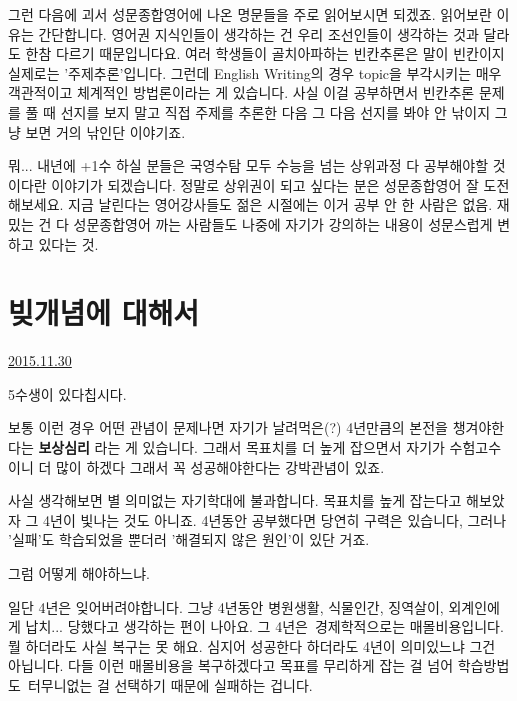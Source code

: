 그런 다음에 괴서 성문종합영어에 나온 명문들을 주로 읽어보시면 되겠죠.
읽어보란 이유는 간단합니다. 영어권 지식인들이 생각하는 건 우리 조선인들이 생각하는 것과 달라도 한참 다르기 때문입니다요.
여러 학생들이 골치아파하는 빈칸추론은 말이 빈칸이지 실제로는 '주제추론'입니다.
그런데 English Writing의 경우 topic을 부각시키는 매우 객관적이고 체계적인 방법론이라는 게 있습니다.
사실 이걸 공부하면서 빈칸추론 문제를 풀 때 선지를 보지 말고 직접 주제를 추론한 다음 그 다음 선지를 봐야 안 낚이지
그냥 보면 거의 낚인단 이야기죠.
\vspace{5mm}

뭐... 내년에 +1수 하실 분들은 국영수탐 모두 수능을 넘는 상위과정 다 공부해야할 것이다란 이야기가 되겠습니다.
정말로 상위권이 되고 싶다는 분은 성문종합영어 잘 도전해보세요. 지금 날린다는 영어강사들도 젊은 시절에는 이거 공부 안 한 사람은 없음.
재밌는 건 다 성문종합영어 까는 사람들도 나중에 자기가 강의하는 내용이 성문스럽게 변하고 있다는 것.
\vspace{5mm}










\section{빚개념에 대해서}
\href{https://www.kockoc.com/Apoc/518747}{2015.11.30}

\vspace{5mm}

5수생이 있다칩시다.
\vspace{5mm}

보통 이런 경우 어떤 관념이 문제나면
자기가 날려먹은(?) 4년만큼의 본전을 챙겨야한다는 \textbf{보상심리} 라는 게 있습니다.
그래서 목표치를 더 높게 잡으면서 자기가 수험고수이니 더 많이 하겠다 그래서 꼭 성공해야한다는 강박관념이 있죠.
\vspace{5mm}

사실 생각해보면 별 의미없는 자기학대에 불과합니다.
목표치를 높게 잡는다고 해보았자 그 4년이 빛나는 것도 아니죠.
4년동안 공부했다면 당연히 구력은 있습니다, 그러나 '실패'도 학습되었을 뿐더러 '해결되지 않은 원인'이 있단 거죠.
\vspace{5mm}

그럼 어떻게 해야하느냐.
\vspace{5mm}

일단 4년은 잊어버려야합니다. 그냥 4년동안 병원생활, 식물인간, 징역살이, 외계인에게 납치... 당했다고 생각하는 편이 나아요.
그 4년은 경제학적으로는 매몰비용입니다. 뭘 하더라도 사실 복구는 못 해요. 심지어 성공한다 하더라도 4년이 의미있느냐 그건 아닙니다.
다들 이런 매몰비용을 복구하겠다고 목표를 무리하게 잡는 걸 넘어 학습방법도 터무니없는 걸 선택하기 때문에 실패하는 겁니다.
\vspace{5mm}

